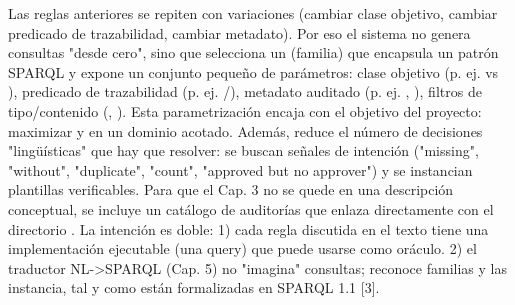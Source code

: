 {}\markdownRendererInterblockSeparator
{}Las reglas anteriores se repiten con variaciones (cambiar clase objetivo, cambiar predicado de trazabilidad, cambiar metadato). Por eso el sistema no genera consultas "desde cero", sino que selecciona un  (familia) que encapsula un patrón SPARQL y expone un conjunto pequeño de parámetros:\markdownRendererInterblockSeparator
{}\markdownRendererUlBeginTight
\markdownRendererUlItem clase objetivo (p. ej.  vs ),\markdownRendererUlItemEnd 
\markdownRendererUlItem predicado de trazabilidad (p. ej. /),\markdownRendererUlItemEnd 
\markdownRendererUlItem metadato auditado (p. ej. , ),\markdownRendererUlItemEnd 
\markdownRendererUlItem filtros de tipo/contenido (, ).\markdownRendererUlItemEnd 
\markdownRendererUlEndTight \markdownRendererInterblockSeparator
{}Esta parametrización encaja con el objetivo del proyecto: maximizar  y  en un dominio acotado. Además, reduce el número de decisiones "lingüísticas" que hay que resolver: se buscan señales de intención ("missing", "without", "duplicate", "count", "approved but no approver") y se instancian plantillas verificables.\markdownRendererInterblockSeparator
{}\markdownRendererInterblockSeparator
{}Para que el Cap. 3 no se quede en una descripción conceptual, se incluye un catálogo de auditorías que enlaza directamente con el directorio . La intención es doble:\markdownRendererInterblockSeparator
{}1)  cada regla discutida en el texto tiene una implementación ejecutable (una query) que puede usarse como oráculo. 2)  el traductor NL->SPARQL (Cap. 5) no "imagina" consultas; reconoce familias y las instancia, tal y como están formalizadas en SPARQL 1.1 [3].\markdownRendererInterblockSeparator
